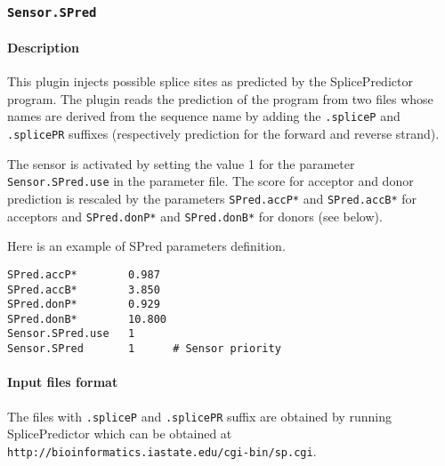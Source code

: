 
\subsubsection{\texttt{Sensor.SPred}}

\paragraph{Description}

This plugin injects possible splice sites as predicted by the
SplicePredictor program. The plugin reads the prediction of
the program from two files whose names are derived from the sequence
name by adding the \texttt{.spliceP} and \texttt{.splicePR} suffixes
(respectively prediction for the forward and reverse strand).

The sensor is activated by setting the value 1 for the parameter
\texttt{Sensor.SPred.use} in the parameter file. The score for acceptor
and donor prediction is rescaled by the parameters {\tt SPred.accP*} and
{\tt SPred.accB*} for acceptors and {\tt SPred.donP*} and {\tt SPred.donB*} for
donors (see below).

Here is an example of SPred parameters definition.
\begin{Verbatim}[fontsize=\small]
SPred.accP*        0.987
SPred.accB*        3.850
SPred.donP*        0.929
SPred.donB*        10.800
Sensor.SPred.use   1
Sensor.SPred       1      # Sensor priority
\end{Verbatim}

\paragraph{Input files format}

The files with \texttt{.spliceP} and \texttt{.splicePR} suffix are
obtained by running SplicePredictor which can be obtained at
\texttt{http://bioinformatics.iastate.edu/cgi-bin/sp.cgi}.

